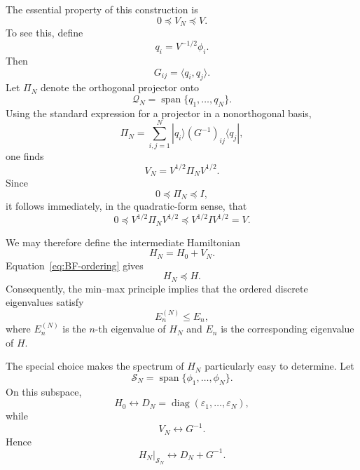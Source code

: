 \documentclass{article}
\theoremstyle{definition}
\begin{document}
The essential property of this construction is
\begin{equation}
    0 \preceq V_N \preceq V .
    \label{eq:BF-ordering}
\end{equation}
To see this, define
\begin{equation}
    q_i = V^{-1/2}\phi_i .
\end{equation}
Then
\begin{equation}
    G_{ij}=\langle q_i,q_j\rangle .
\end{equation}
Let \(\Pi_N\) denote the orthogonal projector onto
\begin{equation}
    \mathcal{Q}_N
    =
    \operatorname{span}\{q_1,\ldots,q_N\}.
\end{equation}
Using the standard expression for a projector in a nonorthogonal
basis,
\begin{equation}
    \Pi_N
    =
    \sum_{i,j=1}^{N}
    |q_i\rangle
    (G^{-1})_{ij}
    \langle q_j| ,
\end{equation}
one finds
\begin{equation}
    V_N
    =
    V^{1/2}\Pi_N V^{1/2}.
\end{equation}
Since
\begin{equation}
    0\preceq\Pi_N\preceq I,
\end{equation}
it follows immediately, in the quadratic-form sense, that
\begin{equation}
    0
    \preceq
    V^{1/2}\Pi_N V^{1/2}
    \preceq
    V^{1/2} I V^{1/2}
    =
    V .
\end{equation}

We may therefore define the intermediate Hamiltonian
\begin{equation}
    H_N = H_0 + V_N .
    \label{eq:BF-HN}
\end{equation}
Equation~\eqref{eq:BF-ordering} gives
\begin{equation}
    H_N \preceq H .
\end{equation}
Consequently, the min--max principle implies that the ordered
discrete eigenvalues satisfy
\begin{equation}
    E_n^{(N)} \leq E_n ,
    \label{eq:BF-lower-bound}
\end{equation}
where \(E_n^{(N)}\) is the \(n\)-th eigenvalue of \(H_N\) and
\(E_n\) is the corresponding eigenvalue of \(H\).

The special choice makes the spectrum of \(H_N\) particularly easy
to determine.  Let
\begin{equation}
    \mathcal{S}_N
    =
    \operatorname{span}\{\phi_1,\ldots,\phi_N\}.
\end{equation}
On this subspace,
\begin{equation}
    H_0
    \longleftrightarrow
    D_N
    =
    \operatorname{diag}
    (\varepsilon_1,\ldots,\varepsilon_N),
\end{equation}
while
\begin{equation}
    V_N
    \longleftrightarrow
    G^{-1}.
\end{equation}
Hence
\begin{equation}
    \boxed{
    H_N\big|_{\mathcal{S}_N}
    \longleftrightarrow
    D_N + G^{-1}.
    }
    \label{eq:BF-finite-matrix}
\end{equation}
\end{document}
